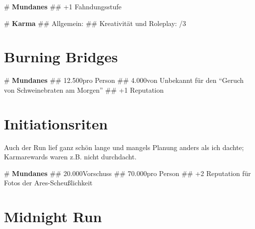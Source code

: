 \begin{easylist}
# \textbf{Mundanes}
## +1 Fahndungsstufe

# \textbf{Karma}
## Allgemein: 
## Kreativität und Roleplay: /3
\end{easylist}



\section{Burning Bridges}

\begin{easylist}
# \textbf{Mundanes}
## 12.500\nuyen pro Person
## 4.000\nuyen von Unbekannt für den ``Geruch von Schweinebraten am Morgen''
## +1 Reputation
\end{easylist}




\section{Initiationsriten}

Auch der Run lief ganz schön lange und mangels Planung anders als ich dachte; Karmarewards waren z.B. nicht durchdacht. 

\begin{easylist}
# \textbf{Mundanes}
## 20.000\nuyen Vorschuss
## 70.000\nuyen pro Person
## +2 Reputation für Fotos der Ares-Scheußlichkeit
\end{easylist}




\section{Midnight Run}




